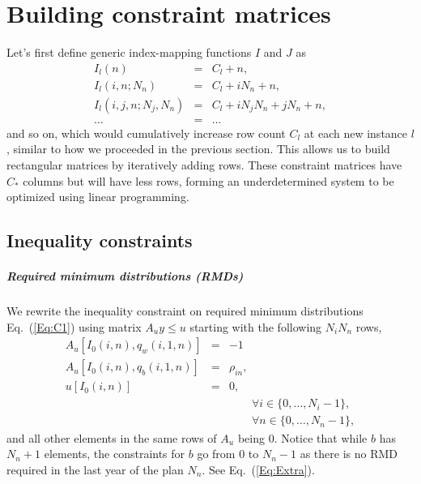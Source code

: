 \documentclass{report}[fleqn,11pt]
\begin{document}
\chapter{Building constraint matrices}
Let's first define generic index-mapping functions $I$ and $J$ as
\begin{eqnarray}
	\label{Eq:Offsets}
	I_l(n) &=& C_l + n, \nonumber \\
	I_l(i, n; N_n) &=& C_l + iN_n + n, \nonumber \\
	I_l(i, j, n; N_j, N_n) &=& C_l + iN_j N_n + jN_n +n, \\
	\ldots &=& \ldots \nonumber
\end{eqnarray}
and so on, which would cumulatively increase row count $C_l$ at each new instance $l$,
similar to how we proceeded in the previous section.
This allows us to build rectangular matrices by iteratively adding rows.
These constraint matrices have $C_*$
columns but will have less rows,
forming an underdetermined system to be optimized using linear programming.

\section{Inequality constraints}

\paragraph*{Required minimum distributions (RMDs)}
We rewrite the inequality constraint on required minimum distributions
Eq.~(\ref{Eq:C1}) using matrix $A_{u}y \le u$ starting with the following $N_iN_n$ rows, 
\begin{eqnarray}
	A_u[I_0(i, n), q_w(i, 1, n)] &=& -1 \nonumber \\
	A_u[I_0(i, n), q_b(i, 1, n)] &=& \rho_{in}, \nonumber \\
	u[I_0(i, n)] &=& 0, \\
	&&\qquad\forall i \in \{0,\ldots, N_i - 1\}, \nonumber\\
	&&\qquad\forall n \in \{0,\ldots, N_n - 1\},\nonumber
\end{eqnarray}
and all other elements in the same rows of $A_u$ being $0$.
Notice that while $b$ has $N_n+1$ elements, the constraints
for $b$ go from $0$ to $N_n-1$ as there is no RMD required in the last year of the plan $N_n$.
See Eq.~(\ref{Eq:Extra}).
\end{document}
